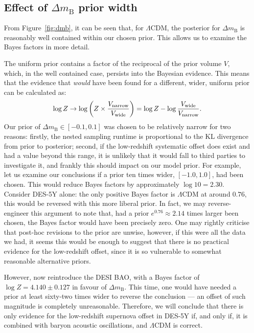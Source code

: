 \documentclass[fleqn,usenatbib]{mnras}
\newcommand{\lcdm}{$\Lambda$CDM}
\newcommand{\dmb}{\ensuremath{\Delta m_\mathrm B}}
\begin{document}
    \subsection{Effect of \dmb{} prior width}\label{sec:priorwidth}
    
    From Figure~\ref{fig:dmb}, it can be seen that, for \lcdm{}, the posterior for \dmb{} is reasonably well contained within our chosen prior.
    This allows us to examine the Bayes factors in more detail.

    The uniform prior contains a factor of the reciprocal of the prior volume $V$, which, in the well contained case, persists into the Bayesian evidence.
    This means that the evidence that \textit{would} have been found for a different, wider, uniform prior can be calculated as:
    \begin{equation}
        \log Z \rightarrow \log\left(Z\times\frac{V_\text{narrow}}{V_\text{wide}}\right) = \log Z - \log\frac{V_\text{wide}}{V_\text{narrow}}\text.
        \label{eq:}
    \end{equation}
    Our prior of $\dmb\in[-0.1, 0.1]$ was chosen to be relatively narrow for two reasons: firstly, the nested sampling runtime is proportional to the KL divergence from prior to posterior; second, if the low-redshift systematic offset does exist and had a value beyond this range, it is unlikely that it would fall to third parties to investigate it, and frankly this should impact on our model prior.
    For example, let us examine our conclusions if a prior ten times wider, $[-1.0, 1.0]$, had been chosen.
    This would reduce Bayes factors by approximately $\log 10 = 2.30$.
    Consider DES-5Y alone: the only positive Bayes factor is \lcdm{} at around $0.76$, this would be reversed with this more liberal prior.
    In fact, we may reverse-engineer this argument to note that, had a prior $e^{0.76}\approx2.14$ times larger been chosen, the Bayes factor would have been precisely zero.
    One may rightly criticise that post-hoc revisions to the prior are unwise, however, if this were all the data we had, it seems this would be enough to suggest that there is no practical evidence for the low-redshift offset, since it is so vulnerable to somewhat reasonable alternative priors.

    However, now reintroduce the DESI BAO, with a Bayes factor of $\log Z = 4.140\pm0.127$ in favour of \dmb{}.
    This time, one would have needed a prior at least sixty-two times wider to reverse the conclusion --- an offset of such magnitude is completely unreasonable.
    Therefore, we will conclude that there is only evidence for the low-redshift supernova offset in DES-5Y if, and only if, it is combined with baryon acoustic oscillations, and \lcdm{} is correct.
\end{document}
